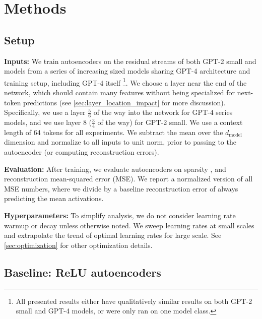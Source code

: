 
\section{Methods}
\label{sec:methods}

\subsection{Setup}


\textbf{Inputs:} We train autoencoders on the residual streams of both GPT-2 small \citep{radford2019language} and models from 
a series of increasing sized models sharing GPT-4 architecture and training setup,
including GPT-4 itself \citep{openai2023gpt}\footnote{All presented results either have qualitatively similar results on both GPT-2 small and GPT-4 models, or were only ran on one model class.}.  
We choose a layer near the end of the network, which should contain many features without being specialized for next-token predictions (see \autoref{sec:layer_location_impact} for more discussion).  Specifically, we use a layer $\frac{5}{6}$ of the way into the network for GPT-4 series models, and we use layer 8 ($\frac{3}{4}$ of the way) for GPT-2 small.
We use a context length of 64 tokens for all experiments.
We subtract the mean over the $d_{\text{model}}$ dimension and normalize to all inputs to unit norm, prior to passing to the autoencoder (or computing reconstruction errors).

\textbf{Evaluation:} After training, we evaluate autoencoders on sparsity \Lzero, and reconstruction mean-squared error (MSE).  We report a normalized version of all MSE numbers, where we divide by a baseline reconstruction error of always predicting the mean activations.  

\textbf{Hyperparameters:} To simplify analysis, we do not consider learning rate warmup or decay unless otherwise noted.  We sweep learning rates at small scales and extrapolate the trend of optimal learning rates for large scale. See \autoref{sec:optimization} for other optimization details.

\subsection{Baseline: ReLU autoencoders}


